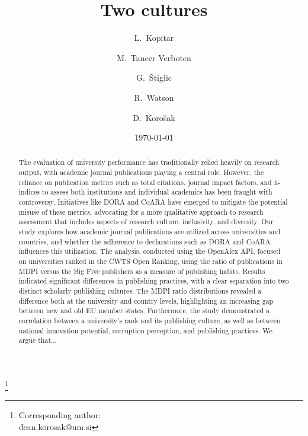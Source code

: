 \documentclass[amsfonts, amssymb, prl, superscriptaddress, notitlepage, twocolumn, nofootinbib]{revtex4-2}
\begin{document}
\title{Two cultures}
\author{L.~Kopitar }

\author{M.~Tancer Verboten}

\author{G.~Štiglic }

\author{R.~Watson }

\author{D.~Korošak  }
\thanks{Corresponding author:\\dean.korosak@um.si}




\date{\today}

\begin{abstract}
The evaluation of university performance has traditionally relied heavily on research output, with academic journal publications playing a central role. However, the reliance on publication metrics such as total citations, journal impact factors, and h-indices to assess both institutions and individual academics has been fraught with controversy. Initiatives like DORA and CoARA have emerged to mitigate the potential misuse of these metrics, advocating for a more qualitative approach to research assessment that includes aspects of research culture, inclusivity, and diversity. Our study explores how academic journal publications are utilized across universities and countries, and whether the adherence to declarations such as DORA and CoARA influences this utilization. The analysis, conducted using the OpenAlex API, focused on universities ranked in the CWTS Open Ranking, using the ratio of publications in MDPI versus the Big Five publishers as a measure of publishing habits. Results indicated significant differences in publishing practices, with a clear separation into two distinct scholarly publishing cultures. The MDPI ratio distributions revealed a difference both at the university and country levels, highlighting an increasing gap between new and old EU member states. Furthermore, the study demonstrated a correlation between a university's rank and its publishing culture, as well as between national innovation potential, corruption perception, and publishing practices. We argue that...
\end{abstract}
\end{document}
